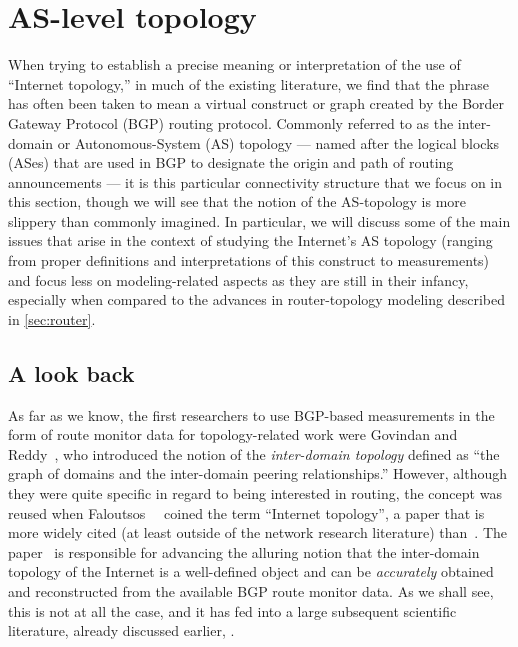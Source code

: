 \section{AS-level topology}
\label{sec:as}

When trying to establish a precise meaning or interpretation of the use of 
``Internet topology,'' in much of the existing literature, we find that the 
phrase has often been taken to mean a virtual construct or graph created by 
the Border Gateway Protocol (BGP) routing protocol.  Commonly referred to as 
the inter-domain or Autonomous-System (AS) topology --- named after the logical 
blocks (ASes) that are used in BGP to designate the origin and path of routing 
announcements --- it is this particular connectivity structure that we focus 
on in this section, though we will see that the notion of the AS-topology is 
more slippery than commonly imagined. In particular, we will discuss some of 
the main issues that arise in the context of studying the Internet's AS topology 
(ranging from proper definitions and interpretations of this construct to 
measurements) and focus less on modeling-related aspects as they are still in
their infancy, especially when compared to the advances in router-topology
modeling described in \autoref{sec:router}.


\subsection{A look back}
\label{sec:as_hist}

As far as we know, the first researchers to use BGP-based measurements
in the form of route monitor data for topology-related work were
Govindan and Reddy~\cite{govindan97:_topology}, who introduced the
notion of the {\em inter-domain topology} defined as ``the graph of
domains and the inter-domain peering relationships.''  However,
although they were quite specific in regard to being interested in
routing, the concept was reused when
Faloutsos~\etal~\cite{faloutsos99:_power_law_relat_of_inter_topol}
coined the term ``Internet topology'', a paper that is more widely
cited (at least outside of the network research literature)
than~\cite{govindan97:_topology}.  The
paper~\cite{faloutsos99:_power_law_relat_of_inter_topol} is
responsible for advancing the alluring notion that the inter-domain
topology of the Internet is a well-defined object and can be {\em
  accurately} obtained and reconstructed from the available BGP route
monitor data. As we shall see, this is not at all the case, and it has
fed into a large subsequent scientific literature, already discussed
earlier, \eg \cite{barabasi99,barabasi02}.

